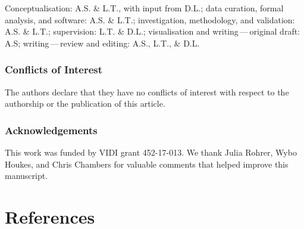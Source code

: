 \documentclass[
  british,
  a4paper,
  ,man,floatsintext]{apa6}
\begin{document}
Conceptualisation: A.S. \& L.T., with input from D.L.; data curation, formal analysis, and software: A.S. \& L.T.; investigation, methodology, and validation: A.S. \& L.T.; supervision: L.T. \& D.L.; visualisation and writing\(\,\)---\(\,\)original draft: A.S; writing\(\,\)---\(\,\)review and editing: A.S., L.T., \& D.L.

\subsubsection{Conflicts of Interest}\label{conflicts-of-interest}

The authors declare that they have no conflicts of interest with respect to the authorship or the publication of this article.

\subsubsection{Acknowledgements}\label{acknowledgements}

This work was funded by VIDI grant 452-17-013. We thank Julia Rohrer, Wybo Houkes, and Chris Chambers for valuable comments that helped improve this manuscript.

\section{References}\label{references}

\setlength{\parindent}{-0.2in}
\setlength{\leftskip}{0.2in}
\end{document}
